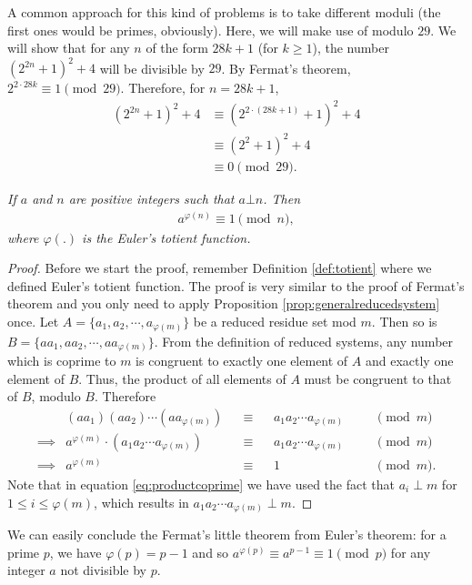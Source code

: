 \documentclass{subfile}
\begin{document}
		\begin{solution}
			A common approach for this kind of problems is to take different moduli (the first ones would be primes, obviously). Here, we will make use of modulo $29$. We will show that for any $n$ of the form $28k+1$ (for $k \geq 1$), the number $(2^{2n}+1 )^2+4$ will be divisible by $29$. By Fermat's theorem, $2^{2 \cdot 28k} \equiv 1 \pmod{29}$. Therefore, for $n=28k+1$, 
				\begin{align*}
					(2^{2n}+1 )^2+4 &\equiv (2^{2\cdot (28k+1)}+1 )^2+4\\
									&\equiv (2^{2}+1 )^2+4\\
									&\equiv 0 \pmod{29}.
				\end{align*}
			
		\end{solution}
	
		\begin{theorem}\slshape
			If $a$ and $n$ are positive integers such that $a \bot n$. Then
			\begin{align*}
			a^{\varphi(n)} \equiv 1 \pmod n,
			\end{align*}
			where $\varphi(.)$ is the Euler's totient function.
		\end{theorem}

		\begin{proof} 
			Before we start the proof, remember Definition \ref{def:totient} where we defined Euler's totient function. The proof is very similar to the proof of Fermat's theorem and you only need to apply Proposition \ref{prop:generalreducedsystem} once. Let $A=\{a_1, a_2, \cdots, a_{\varphi(m)}\}$ be a reduced residue set mod $m$. Then so is $B=\{aa_1, aa_2, \cdots, aa_{\varphi(m)}\}$. From the definition of reduced systems, any number which is coprime to $m$ is congruent to exactly one element of $A$ and exactly one element of $B$. Thus, the product of all elements of $A$ must be congruent to that of $B$, modulo $B$. Therefore
			\begin{align}
			& (aa_1) (aa_2) \cdots (aa_{\varphi(m)}) && \equiv && a_1 a_2 \cdots a_{\varphi(m)} &&&  \pmod m\nonumber\\
			\implies & a^{\varphi(m)} \cdot \left( a_1 a_2 \cdots a_{\varphi(m)}\right) && \equiv && a_1 a_2 \cdots a_{\varphi(m)} &&&  \pmod m\nonumber\\
			\label{eq:productcoprime}\implies & a^{\varphi(m)} && \equiv && 1 &&& \pmod m.
			\end{align}
			Note that in equation \eqref{eq:productcoprime} we have used the fact that $a_i \perp m$ for $1 \leq i \leq \varphi(m)$, which results in $a_1 a_2 \cdots a_{\varphi(m)} \perp m$. 
		\end{proof}
	We can easily conclude the Fermat's little theorem from Euler's theorem: for a prime $p$, we have $\varphi(p)=p-1$ and so $a^{\varphi(p)} \equiv a^{p-1} \equiv 1 \pmod p$ for any integer $a$ not divisible by $p$.
	
\end{document}
